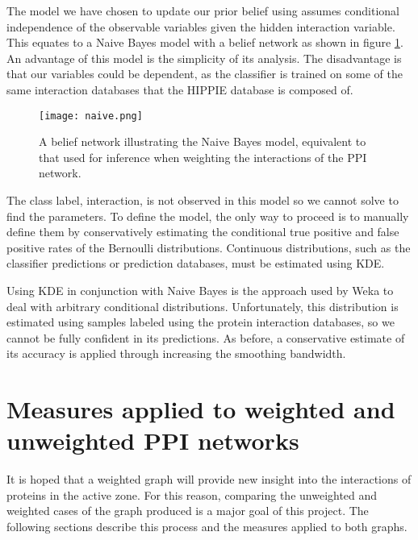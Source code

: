 The model we have chosen to update our prior belief using assumes conditional independence of the observable variables given the hidden interaction variable.
This equates to a Naive Bayes model with a belief network as shown in figure \ref{fig:naive}.
An advantage of this model is the simplicity of its analysis.
The disadvantage is that our variables could be dependent, as the classifier is trained on some of the same interaction databases that the HIPPIE database is composed of.

\begin{figure}
    \centering
    \texttt{[image: naive.png]}
    \caption{A belief network illustrating the Naive Bayes model, equivalent to that used for inference when weighting the interactions of the PPI network.}
    \label{fig:naive}
\end{figure}


The class label, interaction, is not observed in this model so we cannot solve to find the parameters.
To define the model, the only way to proceed is to manually define them by conservatively estimating the conditional true positive and false positive rates of the Bernoulli distributions.
Continuous distributions, such as the classifier predictions or prediction databases, must be estimated using KDE.

Using KDE in conjunction with Naive Bayes is the approach used by Weka to deal with arbitrary conditional distributions\autocite{john_estimating_1995}.
Unfortunately, this distribution is estimated using samples labeled using the protein interaction databases, so we cannot be fully confident in its predictions.
As before, a conservative estimate of its accuracy is applied through increasing the smoothing bandwidth.

\section{Measures applied to weighted and unweighted PPI networks}

It is hoped that a weighted graph will provide new insight into the interactions of proteins in the active zone.
For this reason, comparing the unweighted and weighted cases of the graph produced is a major goal of this project.
The following sections describe this process and the measures applied to both graphs.

